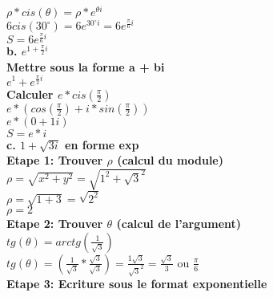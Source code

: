 $\rho*cis(\theta) = \rho * e^{\theta i}$\\

$6 cis(30^{\circ}) = 6e^{30^{\circ}i} = 6e^{\frac{\pi}{6}i}$ \\

$S = 6e^{\frac{\pi}{6}i}$ \\

\vspace{6mm}
\textbf{b. $e^{1 + \frac{\pi}{2}i}$} \\

\textbf{Mettre sous la forme a + bi} \\

$e^{1} + e^{\frac{\pi}{2}i}$ \\

\textbf{Calculer $e*cis(\frac{\pi}{2})$} \\

$e * ( cos(\frac{\pi}{2}) + i*sin(\frac{\pi}{2}) ) $ \\

$e * ( 0 + 1i ) $ \\

$S = e * i $ \\

\vspace{6mm}
\textbf{c. $1 + \sqrt{3i}$ en forme exp} \\

\vspace{3mm}
\textbf{Etape 1: Trouver $\rho$ (calcul du module)} \\

$\rho = \sqrt{x^{2} + y^{2}} = \sqrt{1^{2} + \sqrt{3}^{2}}$ \\

$\rho = \sqrt{1 + 3} = \sqrt{2^{2}}$ \\

$\rho = 2$ \\

\vspace{3mm}
\textbf{Etape 2: Trouver $\theta$ (calcul de l'argument)} \\

$tg(\theta) = arctg(\frac{1}{\sqrt{3}})$ \\

$tg(\theta) = (\frac{1}{\sqrt{3}} * \frac{\sqrt{3}}{\sqrt{3}}) = \frac{1\sqrt{3}}{\sqrt{3}^{2}} = \frac{\sqrt{3}}{3}$ ou $\frac{\pi}{6}$ \\

\vspace{3mm}
\textbf{Etape 3: Ecriture sous le format exponentielle} \\

